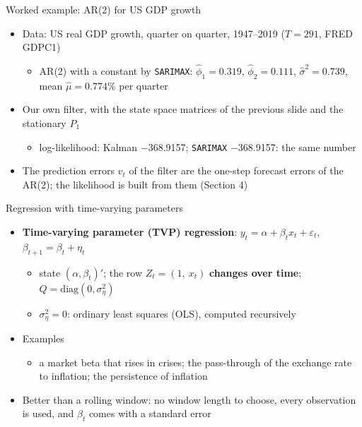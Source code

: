 \begin{frame}{Worked example: AR(2) for US GDP growth}
\itemsize{\small}
\begin{itemize}
    \item Data: US real GDP growth, quarter on quarter, 1947--2019 ($T = 291$, FRED GDPC1)
    \begin{itemize}
        \item AR(2) with a constant by \texttt{SARIMAX}: $\hat\phi_1 = 0.319$, $\hat\phi_2 = 0.111$, $\hat\sigma^2 = 0.739$, mean $\hat\mu = 0.774\%$ per quarter
    \end{itemize}
    \item Our own filter, with the state space matrices of the previous slide and the stationary $P_1$
    \begin{itemize}
        \item log-likelihood: Kalman \ensuremath{-}368.9157; \texttt{SARIMAX} \ensuremath{-}368.9157: the same number
    \end{itemize}
    \item The prediction errors $v_t$ of the filter are the one-step forecast errors of the AR(2); the likelihood is built from them (Section 4)
\end{itemize}
\end{frame}

\begin{frame}{Regression with time-varying parameters}
\itemsize{\small}
\begin{itemize}
    \item \textbf{Time-varying parameter (TVP) regression}: $y_t = \alpha + \beta_t x_t + \varepsilon_t$, \quad $\beta_{t+1} = \beta_t + \eta_t$
    \begin{itemize}
        \item state $(\alpha, \beta_t)'$; the row $Z_t = (1,\ x_t)$ \textbf{changes over time}; $Q = \mathrm{diag}(0, \sigma^2_\eta)$
        \item $\sigma^2_\eta = 0$: ordinary least squares (OLS), computed recursively
    \end{itemize}
    \item Examples
    \begin{itemize}
        \item a market beta that rises in crises; the pass-through of the exchange rate to inflation; the persistence of inflation
    \end{itemize}
    \item Better than a rolling window: no window length to choose, every observation is used, and $\beta_t$ comes with a standard error
\end{itemize}
\end{frame}

